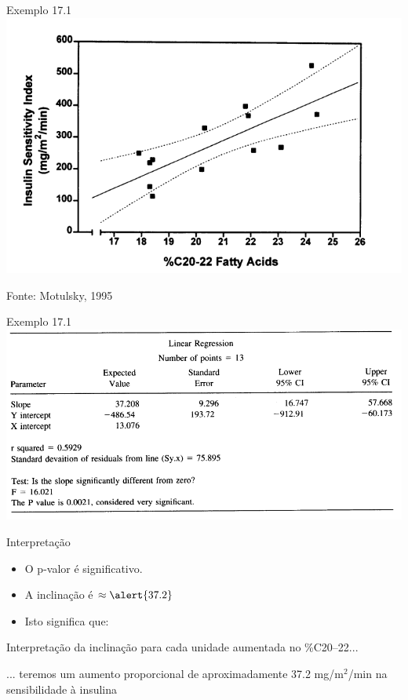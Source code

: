 \documentclass{beamer}
\begin{document}
\begin{frame}{Exemplo 17.1}
  \centering
  \includegraphics[width=.9\textwidth]{Cap18-19/regressao1}

  \vfill
  \hfill \footnotesize Fonte: Motulsky, 1995
\end{frame}

\begin{frame}{Exemplo 17.1}
  \centering
  \includegraphics[width=1.2\textwidth]{Cap18-19/regressao2}
\end{frame}

\begin{frame}{Interpretação}
  \begin{itemize}
  \item O p-valor é significativo.
  \item A inclinação é $\approx \alert{37.2}$
  \item Isto significa que:
  \end{itemize}
  \begin{block}{Interpretação da inclinação}
    \small
    para cada unidade aumentada no \%C20--22...

    \bigskip
    ... teremos um aumento proporcional de aproximadamente 37.2 mg/m$^2$/min na sensibilidade à insulina
  \end{block}
\end{frame}
\end{document}
